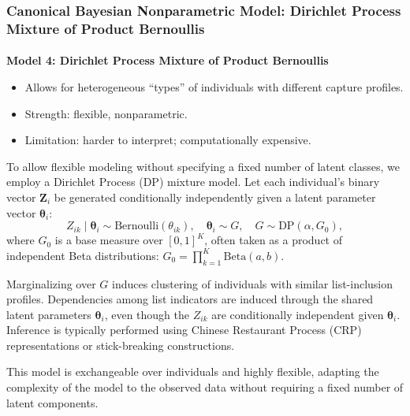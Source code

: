 \documentclass[
  12pt,
]{article}
\makeatletter
\let\oldparagraph\paragraph
\renewcommand{\paragraph}{
    \@ifstar
      \xxxParagraphStar
      \xxxParagraphNoStar
  }
\newcommand{\xxxParagraphStar}[1]{\oldparagraph*{#1}\mbox{}}
\newcommand{\xxxParagraphNoStar}[1]{\oldparagraph{#1}\mbox{}}
\providecommand{\tightlist}{%
  \setlength{\itemsep}{0pt}\setlength{\parskip}{0pt}}\usepackage{longtable,booktabs,array}
\theoremstyle{plain}
\theoremstyle{definition}
\makeatother
\begin{document}
\subsubsection{Canonical Bayesian Nonparametric Model: Dirichlet Process
Mixture of Product
Bernoullis}\label{canonical-bayesian-nonparametric-model-dirichlet-process-mixture-of-product-bernoullis}

\paragraph{\texorpdfstring{\textbf{Model 4: Dirichlet Process Mixture of
Product
Bernoullis}}{Model 4: Dirichlet Process Mixture of Product Bernoullis}}\label{model-4-dirichlet-process-mixture-of-product-bernoullis}

\begin{itemize}
\tightlist
\item
  Allows for heterogeneous ``types'' of individuals with different
  capture profiles.
\item
  Strength: flexible, nonparametric.
\item
  Limitation: harder to interpret; computationally expensive.
\end{itemize}

To allow flexible modeling without specifying a fixed number of latent
classes, we employ a Dirichlet Process (DP) mixture model. Let each
individual's binary vector \(\mathbf{Z}_i\) be generated conditionally
independently given a latent parameter vector \(\boldsymbol{\theta}_i\):
\[
Z_{ik} \mid \boldsymbol{\theta}_i \sim \text{Bernoulli}(\theta_{ik}), \quad \boldsymbol{\theta}_i \sim G, \quad G \sim \text{DP}(\alpha, G_0),
\] where \(G_0\) is a base measure over \([0,1]^K\), often taken as a
product of independent Beta distributions:
\(G_0 = \prod_{k=1}^K \text{Beta}(a, b)\).

Marginalizing over \(G\) induces clustering of individuals with similar
list-inclusion profiles. Dependencies among list indicators are induced
through the shared latent parameters \(\boldsymbol{\theta}_i\), even
though the \(Z_{ik}\) are conditionally independent given
\(\boldsymbol{\theta}_i\). Inference is typically performed using
Chinese Restaurant Process (CRP) representations or stick-breaking
constructions.

This model is exchangeable over individuals and highly flexible,
adapting the complexity of the model to the observed data without
requiring a fixed number of latent components.
\end{document}
